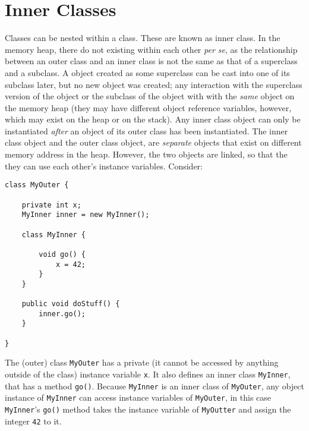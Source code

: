 \documentclass{tufte-handout}
\begin{document}
    \section*{Inner Classes}
    Classes can be nested within a class. These are known as inner class. In the memory heap, there do not existing within each other \textit{per se}, as the relationship between an outer class and an inner class is not the same as that of a superclass and a subclass. A object created as some superclass can be cast into one of its subclass later, but no new object was created; any interaction with the superclass version of the object or the subclass of the object with with the \emph{same} object on the memory heap (they may have different object reference variables, however, which may exist on the heap or on the stack). Any inner class object can only be instantiated \emph{after} an object of its outer class has been instantiated. The inner class object and the outer class object, are \emph{separate} objects that exist on different memory address in the heap. However, the two objects are linked, so that the they can use each other's instance variables. Consider:

    \begin{lstlisting}
class MyOuter {
    
    private int x;
    MyInner inner = new MyInner();

    class MyInner {

        void go() {
            x = 42;
        }
    }

    public void doStuff() {
        inner.go();
    }

}
    \end{lstlisting}

    The (outer) class \texttt{MyOuter} has a private (it cannot be accessed by anything outside of the class) instance variable \texttt{x}. It also defines an inner class \texttt{MyInner}, that has a method \texttt{go()}. Because \texttt{MyInner} is an inner class of \texttt{MyOuter}, any object instance of \texttt{MyInner} can access instance variables of \texttt{MyOuter}, in this case \texttt{MyInner}'s \texttt{go()} method takes the instance variable of \texttt{MyOutter} and assign the integer \texttt{42} to it. 
\end{document}
